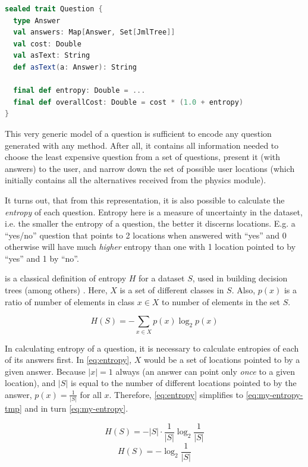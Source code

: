 \begin{lstlisting}[language=Scala,caption={Definition of a question super-type.},label=lst:question]
sealed trait Question {
  type Answer
  val answers: Map[Answer, Set[JmlTree]]
  val cost: Double
  val asText: String
  def asText(a: Answer): String
  
  final def entropy: Double = ...
  final def overallCost: Double = cost * (1.0 + entropy)
}
\end{lstlisting}

This very generic model of a question is sufficient to encode any question generated with any method. After all, it contains all information needed to choose the least expensive question from a set of questions, present it (with answers) to the user, and narrow down the set of possible user locations (which initially contains all the alternatives received from the physics module).

It turns out, that from this representation, it is also possible to calculate the \emph{entropy} of each question. Entropy here is a measure of uncertainty in the dataset, i.e. the smaller the entropy of a question, the better it discerns locations. E.g. a ``yes/no'' question that points to 2 locations when answered with ``yes'' and 0 otherwise will have much \emph{higher} entropy than one with 1 location pointed to by ``yes'' and 1 by ``no''.

 is a classical definition of entropy $H$ for a dataset $S$, used in building decision trees (among others) \cite{quinlan1986induction}. Here, $X$ is a set of different classes in $S$. Also, $p(x)$ is a ratio of number of elements in class $x \in X$ to number of elements in the set $S$.

\begin{equation}
  \label{eq:entropy}
  H(S)=-\sum_{x \in X} p(x) \log_2 p(x)
\end{equation}

In calculating entropy of a question, it is necessary to calculate entropies of each of its answers first. In \cref{eq:entropy}, $X$ would be a set of locations pointed to by a given answer. Because $\vert x \vert = 1$ always (an answer can point only \emph{once} to a given location), and $\vert S \vert$ is equal to the number of different locations pointed to by the answer, $p(x)=\frac{1}{\vert S \vert}$ for all $x$. Therefore, \cref{eq:entropy} simplifies to \cref{eq:my-entropy-tmp} and in turn \cref{eq:my-entropy}.

\begin{equation}
  \label{eq:my-entropy-tmp}
  H(S) = -\vert S \vert \cdot \frac{1}{\vert S \vert} \log_2 \frac{1}{\vert S \vert}
\end{equation}
\begin{equation}
  \label{eq:my-entropy}
  H(S) = -\log_2 \frac{1}{\vert S \vert}
\end{equation}


